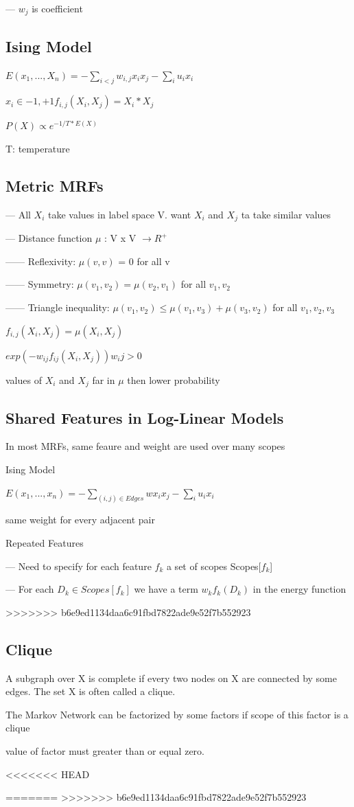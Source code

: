 \documentclass{book}
\begin{document}
--- $w_j$ is coefficient

\subsection{Ising Model}

$E(x_1,...,X_n) = - \sum_{i<j} w_{i,j}x_i x_j - \sum_i u_i x_i$

$x_i \in {-1,+1} f_{i,j}(X_i, X_j) = X_i * X_j $

$P(X) \propto e^{-1/T * E(X)} $

T: temperature 

\subsection{Metric MRFs}

--- All $X_i$ take values in label space V. want $X_i$ and $X_j$ ta take similar values

--- Distance function $\mu$ : V x V $ \rightarrow R^+$

------ Reflexivity: $\mu(v,v)$ = 0 for all v

------ Symmetry: $\mu(v_1,v_2) = \mu(v_2,v_1)$ for all $v_1, v_2$

------ Triangle inequality: $\mu(v_1,v_2) \leq \mu(v_1,v_3) + \mu(v_3,v_2)$ for all $v_1,v_2,v_3$

$f_{i,j}(X_i,X_j) = \mu(X_i,X_j) $

$exp(-w_{ij}f_{ij}(X_i,X_j)) w_ij > 0$

values of $X_i$ and $X_j$ far in $\mu$ then lower probability

\subsection{Shared Features in Log-Linear Models}
 In most MRFs, same feaure and weight are used over many scopes
 
 Ising Model
 
 $E(x_1,...,x_n) = - \sum_{(i,j) \in Edges} w x_i x_j - \sum_i u_i x_i$
 
 same weight for every adjacent pair
 
 Repeated Features
 
 --- Need to specify for each feature $f_k$ a set of scopes Scopes[$f_k$]
 
 --- For each $D_k \in Scopes[f_k]$ we have a term $w_kf_k(D_k)$ in the energy function
 
>>>>>>> b6e9ed1134daa6c91fbd7822ade9e52f7b552923
\subsection{Clique}

A subgraph over X is complete if every two nodes on X are connected by some edges. The set X is often called a clique.

The Markov Network can be factorized by some factors if scope of this factor is a clique

value of factor must greater than or equal zero.

<<<<<<< HEAD

=======
>>>>>>> b6e9ed1134daa6c91fbd7822ade9e52f7b552923
\end{document}
